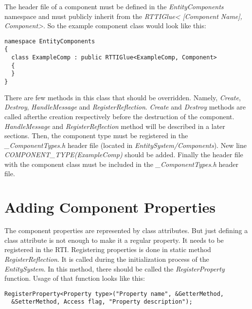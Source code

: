 \documentclass[a4paper, 12pt]{report}
\begin{document}
The header file of a component must be defined in the \emph{EntityComponents} namespace and must publicly inherit from the  \emph{RTTIGlue< [Component Name], Component>}. So the example component class would look like this:

\begin{verbatim}
namespace EntityComponents
{
  class ExampleComp : public RTTIGlue<ExampleComp, Component>
  {
  }
}
\end{verbatim}

There are few methods in this class that should be overridden. Namely, \emph{Create}, \emph{Destroy}, \emph{HandleMessage} and \emph{RegisterReflection}. \emph{Create} and \emph{Destroy} methods are called afterthe  creation respectively before the destruction of the component. \emph{HandleMessage} and \emph{RegisterReflection} method will be described in a later sections.
Then, the component type must be registered in the \emph{\_ComponentTypes.h} header file (located in \emph{EntitySystem/Components}). New line \emph{COMPONENT\_TYPE(ExampleComp)} should be added. Finally the header file with the component class must be included in the \emph{\_ComponentTypes.h} header file.

\section{Adding Component Properties}

The component properties are represented by class attributes. But just defining a class attribute is not enough to make it a regular property. It needs to be registered in the RTI. Registering properties is done in static method \emph{RegisterReflection}. It is called during the initialization process of the \emph{EntitySystem}. In this method, there should be called the \emph{RegisterProperty} function. Usage of that function looks like this:

\begin{verbatim}
RegisterProperty<Property type>("Property name", &GetterMethod, 
  &SetterMethod, Access flag, "Property description");
\end{verbatim}
\end{document}
